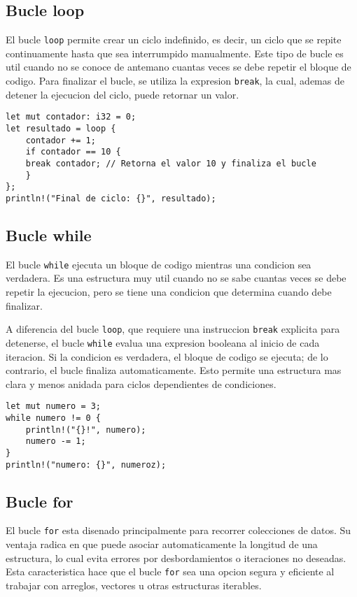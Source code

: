 \documentclass[12pt]{article}
\begin{document}
\subsection{Bucle loop}
El bucle \texttt{loop} permite crear un ciclo indefinido, es decir, un ciclo que se repite continuamente hasta que sea interrumpido manualmente. Este tipo de bucle es util cuando no se conoce de antemano cuantas veces se debe repetir el bloque de codigo. Para finalizar el bucle, se utiliza la expresion \texttt{break}, la cual, ademas de detener la ejecucion del ciclo, puede retornar un valor.

\begin{lstlisting}[style=ruststyle]
let mut contador: i32 = 0;
let resultado = loop {
	contador += 1;
	if contador == 10 {
	break contador; // Retorna el valor 10 y finaliza el bucle
	}
};
println!("Final de ciclo: {}", resultado);
\end{lstlisting}


\subsection{Bucle while}
El bucle \texttt{while} ejecuta un bloque de codigo mientras una condicion sea verdadera. Es una estructura muy util cuando no se sabe cuantas veces se debe repetir la ejecucion, pero se tiene una condicion que determina cuando debe finalizar.

A diferencia del bucle \texttt{loop}, que requiere una instruccion \texttt{break} explicita para detenerse, el bucle \texttt{while} evalua una expresion booleana al inicio de cada iteracion. Si la condicion es verdadera, el bloque de codigo se ejecuta; de lo contrario, el bucle finaliza automaticamente. Esto permite una estructura mas clara y menos anidada para ciclos dependientes de condiciones.

\begin{lstlisting}[style=ruststyle]
	let mut numero = 3;
while numero != 0 {
	println!("{}!", numero);
	numero -= 1;
}
println!("numero: {}", numeroz);
\end{lstlisting}




\subsection{Bucle for}

El bucle \texttt{for} esta disenado principalmente para recorrer colecciones de datos. Su ventaja radica en que puede asociar automaticamente la longitud de una estructura, lo cual evita errores por desbordamientos o iteraciones no deseadas. Esta caracteristica hace que el bucle \texttt{for} sea una opcion segura y eficiente al trabajar con arreglos, vectores u otras estructuras iterables.
\end{document}
